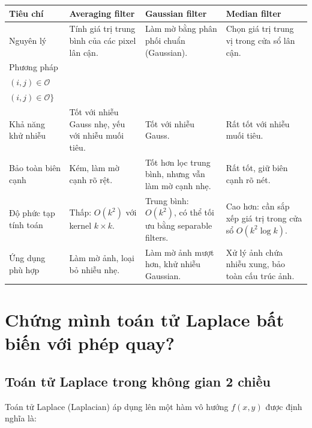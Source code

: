 \documentclass[12pt]{article}
\begin{document}
	\begin{table}[H]
		\centering
		\renewcommand{\arraystretch}{1.4}
		\begin{tabular}{|p{3.8cm}|p{4.1cm}|p{4.1cm}|p{4.1cm}|}
			\hline
			\textbf{Tiêu chí} & \textbf{Averaging filter} & \textbf{Gaussian filter} & \textbf{Median filter} \\
			\hline
			Nguyên lý & Tính giá trị trung bình của các pixel lân cận. & Làm mờ bằng phân phối chuẩn (Gaussian). & Chọn giá trị trung vị trong cửa sổ lân cận. \\
			\hline
			Phương pháp &
			\scriptsize
			\makecell[l]{
				$g(x, y) = \sum_{i} \sum_{j} f(x - i, y - j) \cdot h(i, j),$\\
				$(i,j) \in \mathcal{O}$
			} &
			\scriptsize
			\makecell[l]{
				$h(i, j) = \dfrac{1}{\sqrt{2\pi} \alpha} \, \exp{\left(-\dfrac{i^2 + j^2}{2\alpha^2}\right)}$
			} &
			\scriptsize
			\makecell[l]{
				$g(x,y) = \mathrm{median}\{f(x+i,y+j),$\\
				$(i,j) \in \mathcal{O}\}$
			} \\
			\hline
			Khả năng khử nhiễu & Tốt với nhiễu Gauss nhẹ, yếu với nhiễu muối tiêu. & Tốt với nhiễu Gauss. & Rất tốt với nhiễu muối tiêu. \\
			\hline
			Bảo toàn biên cạnh & Kém, làm mờ cạnh rõ rệt. & Tốt hơn lọc trung bình, nhưng vẫn làm mờ cạnh nhẹ. & Rất tốt, giữ biên cạnh rõ nét. \\
			\hline
			Độ phức tạp tính toán & Thấp: $O(k^2)$ với kernel $k \times k$. & Trung bình: $O(k^2)$, có thể tối ưu bằng separable filters. & Cao hơn: cần sắp xếp giá trị trong cửa sổ $O(k^2 \log k)$. \\
			\hline
			Ứng dụng phù hợp & Làm mờ ảnh, loại bỏ nhiễu nhẹ. & Làm mờ ảnh mượt hơn, khử nhiễu Gaussian. & Xử lý ảnh chứa nhiễu xung, bảo toàn cấu trúc ảnh. \\
			\hline
		\end{tabular}
	\end{table}
	
	\section{Chứng mình toán tử Laplace bất biến với phép quay?}
	
	\subsection{Toán tử Laplace trong không gian 2 chiều}
	
	Toán tử Laplace (Laplacian) áp dụng lên một hàm vô hướng $f(x, y)$ được định nghĩa là:
	
\end{document}
